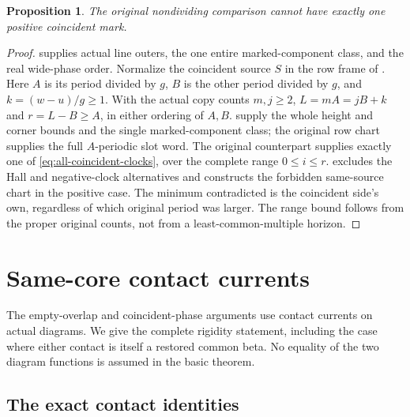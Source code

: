 \documentclass[11pt,a4paper]{amsart}
\numberwithin{equation}{section}
\theoremstyle{plain}
\newtheorem{proposition}[theorem]{Proposition}
\theoremstyle{definition}
\begin{document}
\begin{proposition}\label{prop:one-coincident}
The original nondividing comparison cannot have exactly one positive
coincident mark.
\end{proposition}
\begin{proof}
 supplies actual line outers, the one
entire marked-component class, and the real wide-phase order.  Normalize
the coincident source \(S\) in the row frame of
.  Here \(A\) is its period divided by \(g\),
\(B\) is the other period divided by \(g\), and
\(k=(w-u)/g\ge1\).  With the actual copy counts \(m,j\ge2\),
\(L=mA=jB+k\) and \(r=L-B\ge A\), in either ordering of \(A,B\).
 supply the whole
height and corner bounds and the single marked-component class; the
original row chart supplies the full \(A\)-periodic slot word.
The original counterpart supplies exactly one of
\eqref{eq:all-coincident-clocks}, over the complete range \(0\le i\le r\).
 excludes the Hall and negative-clock
alternatives and constructs the forbidden same-source chart in the
positive case.  The minimum contradicted is the coincident side's own,
regardless of which original period was larger.  The range bound follows
from the proper original counts, not from a least-common-multiple horizon.
\end{proof}


\section{Same-core contact currents}\label{app:contacts}

The empty-overlap and coincident-phase arguments use contact currents on
actual diagrams.  We give the complete rigidity statement, including the
case where either contact is itself a restored common beta.  No equality
of the two diagram functions is assumed in the basic theorem.

\subsection{The exact contact identities}
\end{document}
